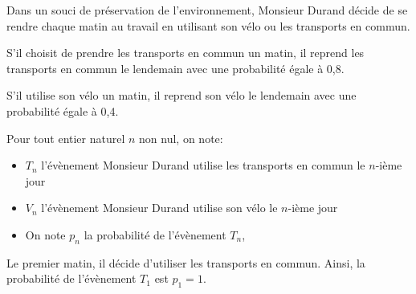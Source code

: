 \medskip

Dans un souci de préservation de l'environnement, Monsieur Durand décide de se rendre
chaque matin au travail en utilisant son vélo ou les transports en commun.

S'il choisit de prendre les transports en commun un matin, il reprend les transports en
commun le lendemain avec une probabilité égale à 0,8.

S'il utilise son vélo un matin, il reprend son vélo le lendemain avec une probabilité égale
à 0,4.

\medskip

Pour tout entier naturel $n$ non nul, on note:
\begin{itemize}
\item  $T_n$ l'évènement \og Monsieur Durand utilise les transports en commun le $n$-ième jour\fg
\item  $V_n$ l'évènement \og  Monsieur Durand utilise son vélo le $n$-ième jour\fg
\item On note $p_n$ la probabilité de l'évènement $T_n$,
\end{itemize}

Le premier matin, il décide d'utiliser les transports en commun. Ainsi, la probabilité de
l'évènement $T_1$ est $p_1 = 1$.

